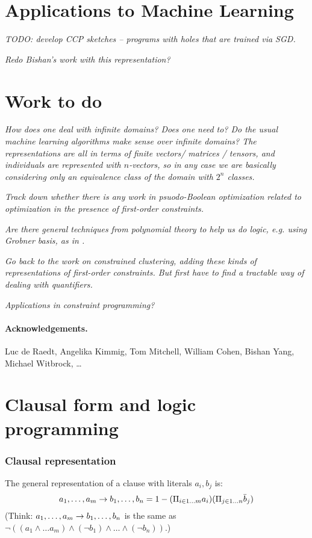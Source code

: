 \documentclass{article} %
\begin{document}
\section{Applications to Machine Learning}

{\em TODO: develop CCP sketches -- programs with holes that are trained via SGD.}

{\em Redo Bishan's work with this representation?}

\section{Work to do}

{\em How does one deal with infinite domains? Does one need to? Do the
usual machine learning algorithms make sense over infinite domains?
The representations are all in terms of finite vectors/ matrices /
tensors, and individuals are represented with $n$-vectors, so in any
case we are basically considering only an equivalence class of the
domain with $2^n$ classes.}

{\em Track down whether there is any work in psuodo-Boolean
  optimization related to optimization in the presence of first-order
  constraints.
}

{\em Are there general techniques from polynomial theory to help us do
  logic, e.g. using Grobner basis, as in \cite{Brickenstein:2009:PFG:1550968.1551286}.}

{\em Go back to the work on constrained clustering, adding these kinds
of representations of first-order constraints. But first have to find
a tractable way of dealing with quantifiers.}

{\em Applications in constraint programming?}

\paragraph{Acknowledgements.} Luc de Raedt, Angelika Kimmig, Tom Mitchell, William Cohen, Bishan Yang, Michael Witbrock, \ldots




\appendix

\section{Clausal form and logic programming}
\subsubsection{Clausal representation}
The general representation of a clause with literals $a_i,b_j$ is:
\begin{equation}
a_1,\ldots, a_m \rightarrow b_1, \ldots, b_n = 1-(\Pi_{i \in 1\ldots m} a_i)  (\Pi_{j\in 1\ldots n} \bar{b}_j)
\end{equation}
\noindent (Think: $a_1,\ldots, a_m \rightarrow b_1, \ldots, b_n$ is the same as $\neg ((a_1 \wedge \ldots a_m)
\wedge (\neg b_1) \wedge \ldots \wedge (\neg b_n))$.)
\end{document}
